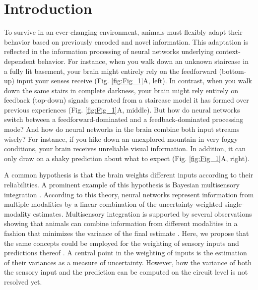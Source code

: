 \documentclass[10pt,a4paper]{article}
\begin{document}
\section*{Introduction}
%
To survive in an ever-changing environment, animals must flexibly adapt their behavior based on previously encoded and novel information. This adaptation is reflected in the information processing of neural networks underlying context-dependent behavior. For instance, when you walk down an unknown staircase in a fully lit basement, your brain might entirely rely on the feedforward (bottom-up) input your senses receive (Fig. \ref{fig:Fig_1}A, left). In contrast, when you walk down the same stairs in complete darkness, your brain might rely entirely on feedback (top-down) signals generated from a staircase model it has formed over previous experiences (Fig. \ref{fig:Fig_1}A, middle). But how do neural networks switch between a feedforward-dominated and a feedback-dominated processing mode? And how do neural networks in the brain combine both input streams wisely? For instance, if you hike down an unexplored mountain in very foggy conditions, your brain receives unreliable visual information. In addition, it can only draw on a shaky prediction about what to expect (Fig. \ref{fig:Fig_1}A, right). 

A common hypothesis is that the brain weights different inputs according to their reliabilities. A prominent example of this hypothesis is Bayesian multisensory integration \citep[see, e.g.,][]{deneve2004bayesian}. According to this theory, neural networks represent information from multiple modalities by a linear combination of the uncertainty-weighted single-modality estimates. Multisensory integration is supported by several observations showing that animals can combine information from different modalities in a fashion that minimizes the variance of the final estimate \citep{ernst2002humans, battaglia2003bayesian, kording2004bayesian, alais2004ventriloquist, rowland2007bayesian, gu2008neural, fetsch2012neural}. Here, we propose that the same concepts could be employed for the weighting of sensory inputs and predictions thereof \citep{kording2004bayesian, yon2021precision}. A central point in the weighting of inputs is the estimation of their variances as a measure of uncertainty. However, how the variance of both the sensory input and the prediction can be computed on the circuit level is not resolved yet.  
\end{document}
